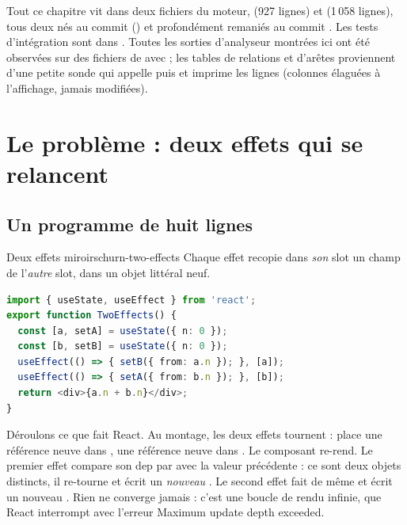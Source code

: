Tout ce chapitre vit dans deux fichiers du moteur, 
(927 lignes) et  (1\,058 lignes), tous deux nés au commit
 () et profondément remaniés au commit \snapshotCommit. Les tests
d'intégration sont dans . Toutes les sorties d'analyseur
montrées ici ont été observées sur des fichiers de  avec
 ;
les tables de relations et d'arêtes proviennent d'une petite sonde qui appelle
 puis  et imprime les
lignes (colonnes élaguées à l'affichage, jamais modifiées).

\section{Le problème : deux effets qui se relancent}
\label{sec:churn-probleme}

\subsection{Un programme de huit lignes}

\begin{exemple}{Deux effets miroirs}{churn-two-effects}
Chaque effet recopie dans \emph{son} slot un champ de l'\emph{autre} slot, dans un objet
littéral neuf.
\begin{lstlisting}[language=TypeScript,caption={\file{/tmp/ch15/two_effects.tsx}},label={lst:churn-two-effects}]
import { useState, useEffect } from 'react';
export function TwoEffects() {
  const [a, setA] = useState({ n: 0 });
  const [b, setB] = useState({ n: 0 });
  useEffect(() => { setB({ from: a.n }); }, [a]);
  useEffect(() => { setA({ from: b.n }); }, [b]);
  return <div>{a.n + b.n}</div>;
}
\end{lstlisting}
\end{exemple}

Déroulons ce que fait React. Au montage, les deux effets tournent : 
place une référence neuve dans ,  une référence neuve dans
. Le composant re-rend. Le premier effet compare son dep  par
 avec la valeur précédente : ce sont deux objets distincts, il re-tourne
et écrit un \emph{nouveau} . Le second effet fait de même et écrit un nouveau
. Rien ne converge jamais : c'est une boucle de rendu infinie, que React
interrompt avec l'erreur \og Maximum update depth exceeded\fg.


